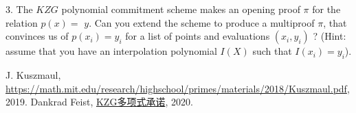 \documentclass[10pt]{ctexart}
\begin{document}
3. The $KZG$ polynomial commitment scheme makes an opening proof $\pi$ for the relation $p(x)=$ $y$. Can you extend the scheme to produce a multiproof $\pi$, that convinces us of $p\left(x_{i}\right)=y_{i}$ for a list of points and evaluations $\left(x_{i}, y_{i}\right)$ ? (Hint: assume that you have an interpolation polynomial $I(X)$ such that $I\left(x_{i}\right)=y_{i}$).

\begin{thebibliography}{10}
    J. Kuszmaul, \href{https://math.mit.edu/research/highschool/primes/materials/2018/Kuszmaul.pdf}{https://math.mit.edu/research/highschool/primes/materials/2018/Kuszmaul.pdf}, 2019.  
    Dankrad Feist, \href{https://dankradfeist.de/ethereum/2020/06/16/kate-polynomial-commitments.html}{KZG多项式承诺}, 2020. 
\end{thebibliography}
\end{document}
